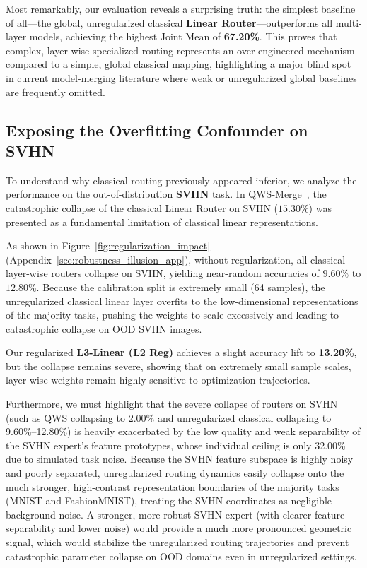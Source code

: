 Most remarkably, our evaluation reveals a surprising truth: the simplest baseline of all—the global, unregularized classical \textbf{Linear Router}—outperforms all multi-layer models, achieving the highest Joint Mean of \textbf{67.20\%}. This proves that complex, layer-wise specialized routing represents an over-engineered mechanism compared to a simple, global classical mapping, highlighting a major blind spot in current model-merging literature where weak or unregularized global baselines are frequently omitted.

\subsection{Exposing the Overfitting Confounder on SVHN}
To understand why classical routing previously appeared inferior, we analyze the performance on the out-of-distribution \textbf{SVHN} task. In QWS-Merge~\cite{qwsmerge}, the catastrophic collapse of the classical Linear Router on SVHN ($15.30\%$) was presented as a fundamental limitation of classical linear representations.

As shown in Figure~\ref{fig:regularization_impact} (Appendix~\ref{sec:robustness_illusion_app}), without regularization, all classical layer-wise routers collapse on SVHN, yielding near-random accuracies of $9.60\%$ to $12.80\%$. Because the calibration split is extremely small (64 samples), the unregularized classical linear layer overfits to the low-dimensional representations of the majority tasks, pushing the weights to scale excessively and leading to catastrophic collapse on OOD SVHN images. 

Our regularized \textbf{L3-Linear (L2 Reg)} achieves a slight accuracy lift to \textbf{13.20\%}, but the collapse remains severe, showing that on extremely small sample scales, layer-wise weights remain highly sensitive to optimization trajectories.

Furthermore, we must highlight that the severe collapse of routers on SVHN (such as QWS collapsing to 2.00\% and unregularized classical collapsing to 9.60\%--12.80\%) is heavily exacerbated by the low quality and weak separability of the SVHN expert's feature prototypes, whose individual ceiling is only 32.00\% due to simulated task noise. Because the SVHN feature subspace is highly noisy and poorly separated, unregularized routing dynamics easily collapse onto the much stronger, high-contrast representation boundaries of the majority tasks (MNIST and FashionMNIST), treating the SVHN coordinates as negligible background noise. A stronger, more robust SVHN expert (with clearer feature separability and lower noise) would provide a much more pronounced geometric signal, which would stabilize the unregularized routing trajectories and prevent catastrophic parameter collapse on OOD domains even in unregularized settings.

